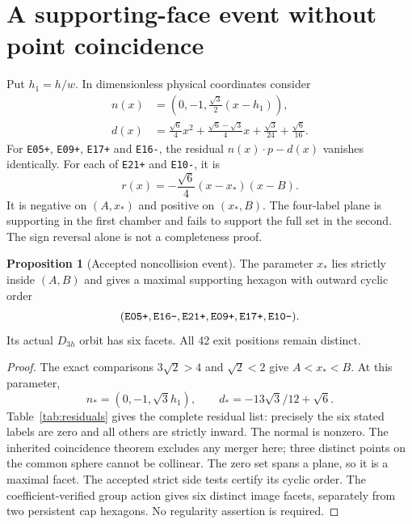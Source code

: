 \documentclass[11pt,a4paper]{article}
\newcommand{\xs}{x_*}
\newcommand{\br}[1]{\textnormal{\texttt{#1}}}
\theoremstyle{definition}
\newtheorem{proposition}[theorem]{Proposition}
\begin{document}
\clearpage
\section{A supporting-face event without point coincidence}\label{sec:event}
Put $h_1=h/w$. In dimensionless physical coordinates consider
\begin{align}
n(x)&=\left(0,-1,\frac{\sqrt3}{2}(x-h_1)\right),\label{eq:candidate-n}\\
d(x)&=\frac{\sqrt6}{4}x^2+\frac{\sqrt6-\sqrt3}{4}x
       +\frac{\sqrt3}{24}+\frac{\sqrt6}{16}.\label{eq:candidate-d}
\end{align}
For \br{E05+}, \br{E09+}, \br{E17+} and \br{E16-}, the residual $n(x)\cdot p-d(x)$ vanishes identically. For each of \br{E21+} and \br{E10-}, it is
\begin{equation}\label{eq:factor}
r(x)=-\frac{\sqrt6}{4}(x-\xs)(x-B).
\end{equation}
It is negative on $(A,\xs)$ and positive on $(\xs,B)$. The four-label plane is supporting in the first chamber and fails to support the full set in the second. The sign reversal alone is not a completeness proof.

\begin{proposition}[Accepted noncollision event]\label{prop:event}
The parameter $\xs$ lies strictly inside $(A,B)$ and gives a maximal supporting hexagon with outward cyclic order
\begin{equation}\label{eq:hex-cycle}
(\br{E05+},\br{E16-},\br{E21+},\br{E09+},\br{E17+},\br{E10-}).
\end{equation}
Its actual $D_{3h}$ orbit has six facets. All 42 exit positions remain distinct.
\end{proposition}
\begin{proof}
The exact comparisons $3\sqrt2>4$ and $\sqrt2<2$ give $A<\xs<B$. At this parameter,
\[
n_*=(0,-1,\sqrt3h_1),\qquad d_*=-13\sqrt3/12+\sqrt6.
\]
Table~\ref{tab:residuals} gives the complete residual list: precisely the six stated labels are zero and all others are strictly inward. The normal is nonzero. The inherited coincidence theorem excludes any merger here; three distinct points on the common sphere cannot be collinear. The zero set spans a plane, so it is a maximal facet. The accepted strict side tests certify its cyclic order. The coefficient-verified group action gives six distinct image facets, separately from two persistent cap hexagons. No regularity assertion is required.
\end{proof}

\end{document}
